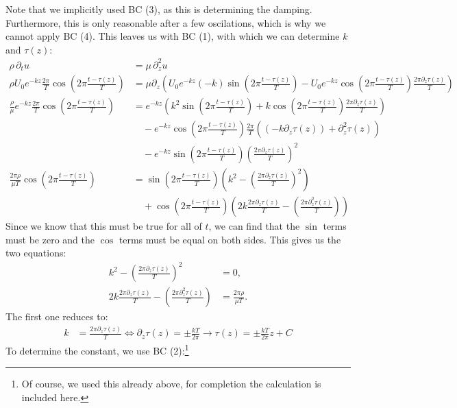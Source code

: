 \documentclass{article}
\begin{document}
Note that we implicitly used BC (3), as this is determining the damping. Furthermore, this is only reasonable after a few oscilations, which is why we cannot apply BC (4). This leaves us with BC (1), with which we can determine $k$ and $\tau(z)$:
\begin{align*}
    \rho \,\partial_t u &= \mu \,\partial_z^2 u\\
    \rho U_0 e^{-kz} \frac{2\pi}{T} \cos\!\left( 2\pi \frac{t - \tau(z)}{T} \right) &=\mu\partial _z\left(U_0e^{-kz}(-k)\sin\left(2\pi\frac{t-\tau(z)}{T}\right)-U_0e^{-kz}\cos\left(2\pi\frac{t-\tau(z)}{T}\right)\frac{2\pi\partial_z\tau(z)}{T}\right)\\
    \frac{\rho}{\mu}e^{-kz}\frac{2\pi}{T}\cos\!\left( 2\pi \frac{t - \tau(z)}{T} \right) &=e^{-kz}\left(k^2\sin \left(2\pi\frac{t-\tau(z)}{T}\right)+k\cos \left(2\pi\frac{t-\tau(z)}{T}\right)\frac{2\pi\partial_z\tau(z)}{T}\right)\\
    &\quad -e^{-kz}\cos\left(2\pi\frac{t-\tau(z)}{T}\right)\frac{2\pi}{T}\left((-k\partial _z\tau(z))+\partial ^2_z\tau(z)\right)\\
    &\quad-e^{-kz}\sin\left(2\pi\frac{t-\tau(z)}{T}\right)\left(\frac{2\pi\partial_z\tau(z)}{T}\right)^2\\
    \frac{2\pi\rho}{\mu T}\cos\!\left( 2\pi \frac{t - \tau(z)}{T} \right) &=\sin \left(2\pi\frac{t-\tau(z)}{T}\right)\left(k^2-\left(\frac{2\pi\partial_z\tau(z)}{T}\right)^2\right)\\
    &\quad+\cos \left(2\pi\frac{t-\tau(z)}{T}\right)\left(2k\frac{2\pi\partial_z\tau(z)}{T}-\left(\frac{2\pi\partial_z^2\tau(z)}{T}\right)\right)
\end{align*}
Since we know that this must be true for all of $t$, we can find that the $\sin$ terms must be zero and the $\cos$ terms must be equal on both sides. This gives us the two equations: 
\begin{align*}
    k^2-\left(\frac{2\pi\partial_z\tau(z)}{T}\right)^2&=0,\\
    2k\frac{2\pi\partial_z\tau(z)}{T}-\left(\frac{2\pi\partial_z^2\tau(z)}{T}\right)&=\frac{2\pi\rho}{\mu T}.
\end{align*}
The first one reduces to: 
\begin{align*}
    k&=\frac{2\pi\partial_z\tau(z)}{T} \Leftrightarrow \partial_z\tau(z) = \pm \frac{kT}{2\pi} \rightarrow \tau(z) = \pm \frac{kT}{2\pi}z + C
\end{align*}
To determine the constant, we use BC (2):\footnote{Of course, we used this already above, for completion the calculation is included here.}
\end{document}
